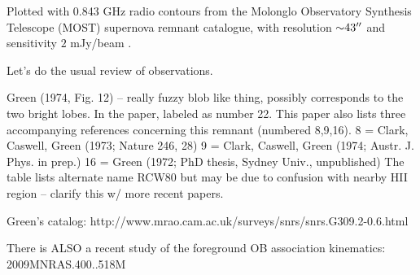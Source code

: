 \documentclass[twocolumn,tighten,trackchanges]{aastex6}
\newcommand*{\abt}{\mathord{\sim}} %
\begin{document}
%
%
%
%




Plotted with 0.843 GHz radio contours from the Molonglo Observatory Synthesis
Telescope (MOST) supernova remnant catalogue, with resolution $\abt 43\arcsec$
and sensitivity $2$ mJy/beam \citep{whiteoak1996}.

Let's do the usual review of observations.

Green (1974, Fig. 12) -- really fuzzy blob like thing, possibly corresponds to
the two bright lobes.  In the paper, labeled as number 22. This paper also
lists three accompanying references concerning this remnant (numbered 8,9,16).
    8 = Clark, Caswell, Green (1973; Nature 246, 28)
    9 = Clark, Caswell, Green (1974; Austr. J. Phys. in prep.)
    16 = Green (1972; PhD thesis, Sydney Univ., unpublished)
The table lists alternate name RCW80 but may be due to confusion with nearby HII
region -- clarify this w/ more recent papers.

Green's catalog: http://www.mrao.cam.ac.uk/surveys/snrs/snrs.G309.2-0.6.html


There is ALSO a recent study of the foreground OB association kinematics:
2009MNRAS.400..518M
\end{document}
